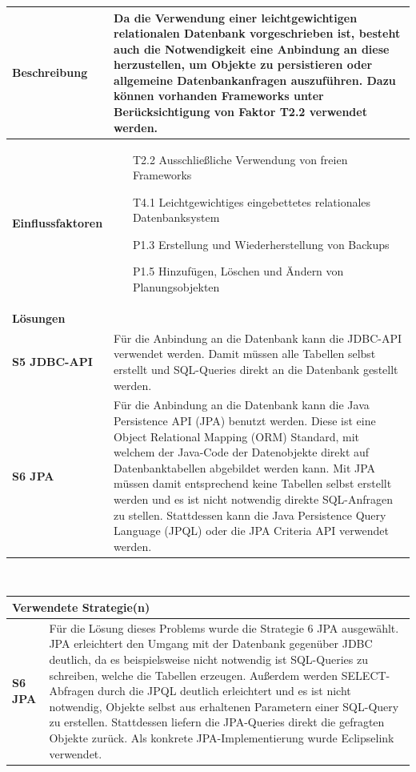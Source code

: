 \documentclass[fontsize=12pt,paper=a4,twoside]{scrartcl}
\begin{document}
\begin{tabularx}{\textwidth}{|p{6cm}|X|}
 \hline
 \textbf{Beschreibung} & Da die Verwendung einer leichtgewichtigen relationalen Datenbank vorgeschrieben ist, besteht auch die Notwendigkeit eine Anbindung an diese herzustellen, um Objekte zu persistieren oder allgemeine Datenbankanfragen auszuführen. Dazu können vorhanden Frameworks unter Berücksichtigung von Faktor T2.2 verwendet werden.\\\hline
 \textbf{Einflussfaktoren} &
 \begin{itemize}
\item[T2.2] Ausschließliche Verwendung von freien Frameworks
\item[T4.1] Leichtgewichtiges eingebettetes relationales Datenbanksystem
\item[P1.3] Erstellung und Wiederherstellung von Backups
\item[P1.5] Hinzufügen, Löschen und Ändern von Planungsobjekten
 \end{itemize}\\\hline
\multicolumn{2}{|l|}{\textbf{Lösungen}} \\\hline
\textbf{S5 JDBC-API} & Für die Anbindung an die Datenbank kann die JDBC-API verwendet werden. Damit müssen alle Tabellen selbst erstellt und SQL-Queries direkt an die Datenbank gestellt werden. \\

\textbf{S6 JPA} & Für die Anbindung an die Datenbank kann die Java Persistence API (JPA) benutzt werden. Diese ist eine Object Relational Mapping (ORM) Standard, mit welchem der Java-Code der Datenobjekte direkt auf Datenbanktabellen abgebildet werden kann. Mit JPA müssen damit entsprechend keine Tabellen selbst erstellt werden und es ist nicht notwendig direkte SQL-Anfragen zu stellen. Stattdessen kann die Java Persistence Query Language (JPQL) oder die JPA Criteria API verwendet werden. \\\hline
\end{tabularx}\\

\begin{tabularx}{\textwidth}{|p{6cm}|X|}
 \hline
\multicolumn{2}{|l|}{\textbf{Verwendete Strategie(n)}} \\\hline
 \textbf{S6 JPA}   & Für die Lösung dieses Problems wurde die Strategie 6 JPA ausgewählt. JPA erleichtert den Umgang mit der Datenbank gegenüber JDBC deutlich, da es beispielsweise nicht notwendig ist SQL-Queries zu schreiben, welche die Tabellen erzeugen. Außerdem werden SELECT-Abfragen durch die JPQL deutlich erleichtert und es ist nicht notwendig, Objekte selbst aus erhaltenen Parametern einer SQL-Query zu erstellen. Stattdessen liefern die JPA-Queries direkt die gefragten Objekte zurück. Als konkrete JPA-Implementierung wurde Eclipselink verwendet.\\\hline
\end{tabularx}
\end{document}
